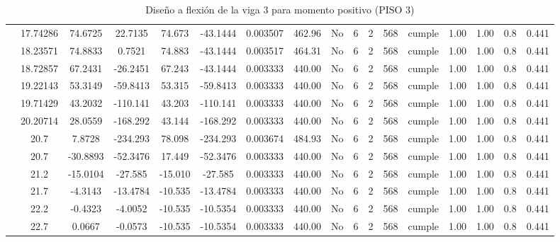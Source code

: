 \begin{table}[H]
{\begin{tabular}{|c|c|c|c|c|c|c|c|c|c|c|c|c|c|c|c|c|}
\cline{2-17}        & 17.74286 & 74.6725 & 22.7135 & 74.673 & -43.1444 & 0.003507 & 462.96 & No  & 6   & 2   & 568 & \cellcolor[rgb]{ .776,  .937,  .808}cumple & 1.00 & 1.00 & 0.8 & 0.441 \bigstrut\\
\cline{2-17}        & 18.23571 & 74.8833 & 0.7521 & 74.883 & -43.1444 & 0.003517 & 464.31 & No  & 6   & 2   & 568 & \cellcolor[rgb]{ .776,  .937,  .808}cumple & 1.00 & 1.00 & 0.8 & 0.441 \bigstrut\\
\cline{2-17}        & 18.72857 & 67.2431 & -26.2451 & 67.243 & -43.1444 & 0.003333 & 440.00 & No  & 6   & 2   & 568 & \cellcolor[rgb]{ .776,  .937,  .808}cumple & 1.00 & 1.00 & 0.8 & 0.441 \bigstrut\\
\cline{2-17}        & 19.22143 & 53.3149 & -59.8413 & 53.315 & -59.8413 & 0.003333 & 440.00 & No  & 6   & 2   & 568 & \cellcolor[rgb]{ .776,  .937,  .808}cumple & 1.00 & 1.00 & 0.8 & 0.441 \bigstrut\\
\cline{2-17}        & 19.71429 & 43.2032 & -110.141 & 43.203 & -110.141 & 0.003333 & 440.00 & No  & 6   & 2   & 568 & \cellcolor[rgb]{ .776,  .937,  .808}cumple & 1.00 & 1.00 & 0.8 & 0.441 \bigstrut\\
\cline{2-17}        & 20.20714 & 28.0559 & -168.292 & 43.144 & -168.292 & 0.003333 & 440.00 & No  & 6   & 2   & 568 & \cellcolor[rgb]{ .776,  .937,  .808}cumple & 1.00 & 1.00 & 0.8 & 0.441 \bigstrut\\
\cline{2-17}        & \cellcolor[rgb]{ .851,  .882,  .949}20.7 & 7.8728 & -234.293 & 78.098 & -234.293 & 0.003674 & 484.93 & No  & 6   & 2   & 568 & \cellcolor[rgb]{ .776,  .937,  .808}cumple & 1.00 & 1.00 & 0.8 & 0.441 \bigstrut\\
\cline{2-17}        & \cellcolor[rgb]{ .851,  .882,  .949}20.7 & -30.8893 & -52.3476 & 17.449 & -52.3476 & 0.003333 & 440.00 & No  & 6   & 2   & 568 & \cellcolor[rgb]{ .776,  .937,  .808}cumple & 1.00 & 1.00 & 0.8 & 0.441 \bigstrut\\
\cline{2-17}        & 21.2 & -15.0104 & -27.585 & -15.010 & -27.585 & 0.003333 & 440.00 & No  & 6   & 2   & 568 & \cellcolor[rgb]{ .776,  .937,  .808}cumple & 1.00 & 1.00 & 0.8 & 0.441 \bigstrut\\
\cline{2-17}        & 21.7 & -4.3143 & -13.4784 & -10.535 & -13.4784 & 0.003333 & 440.00 & No  & 6   & 2   & 568 & \cellcolor[rgb]{ .776,  .937,  .808}cumple & 1.00 & 1.00 & 0.8 & 0.441 \bigstrut\\
\cline{2-17}        & 22.2 & -0.4323 & -4.0052 & -10.535 & -10.5354 & 0.003333 & 440.00 & No  & 6   & 2   & 568 & \cellcolor[rgb]{ .776,  .937,  .808}cumple & 1.00 & 1.00 & 0.8 & 0.441 \bigstrut\\
\cline{2-17}        & 22.7 & 0.0667 & -0.0573 & -10.535 & -10.5354 & 0.003333 & 440.00 & No  & 6   & 2   & 568 & \cellcolor[rgb]{ .776,  .937,  .808}cumple & 1.00 & 1.00 & 0.8 & 0.441 \bigstrut\\
    \hline
    \end{tabular}%
  

  }%
    \caption{Diseño a flexión de la viga 3 para momento positivo (PISO 3) }
  \label{tab:F VG3 P3 M+}%
\end{table}%
